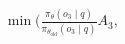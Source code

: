 \documentclass[preview]{standalone}
\begin{document}
\begin{align*}
\min \big(\frac{\pi_\theta(o_3 \mid q)}{\pi_{\theta_{\text{old}}}(o_3 \mid q)} A_3,
\end{align*}
\end{document}
